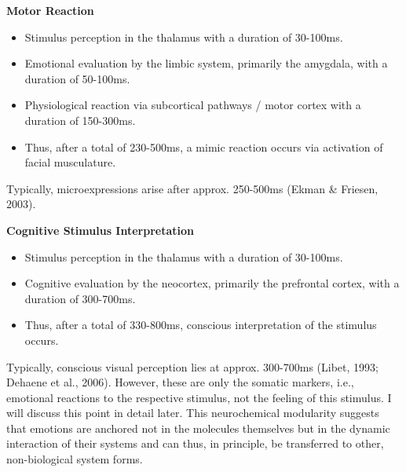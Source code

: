 \textbf{Motor Reaction}
\begin{itemize}
    \item Stimulus perception in the thalamus with a duration of 30-100ms.
    \item Emotional evaluation by the limbic system, primarily the amygdala, with a duration of 50-100ms.
    \item Physiological reaction via subcortical pathways / motor cortex with a duration of 150-300ms.
    \item Thus, after a total of 230-500ms, a mimic reaction occurs via activation of facial musculature.
\end{itemize}
Typically, microexpressions arise after approx. 250-500ms (Ekman & Friesen, 2003).

\textbf{Cognitive Stimulus Interpretation}
\begin{itemize}
    \item Stimulus perception in the thalamus with a duration of 30-100ms.
    \item Cognitive evaluation by the neocortex, primarily the prefrontal cortex, with a duration of 300-700ms.
    \item Thus, after a total of 330-800ms, conscious interpretation of the stimulus occurs.
\end{itemize}
Typically, conscious visual perception lies at approx. 300-700ms (Libet, 1993; Dehaene et al., 2006).
However, these are only the somatic markers, i.e., emotional reactions to the respective stimulus, not the feeling of this stimulus.
I will discuss this point in detail later.
This neurochemical modularity suggests that emotions are anchored not in the molecules themselves but in the dynamic interaction of their systems and can thus, in principle, be transferred to other, non-biological system forms.

